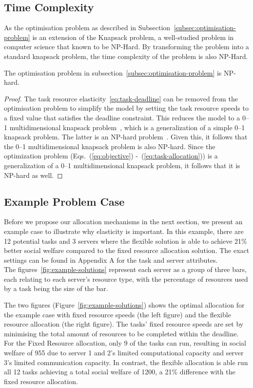 \subsection{Time Complexity}
\label{subsec:time-complexity}
As the optimisation problem as described in Subsection~\ref{subsec:optimisation-problem} is an extension of the
Knapsack problem, a well-studied problem in computer science that known to be NP-Hard. By transforming the problem into
a standard knapsack problem, the time complexity of the problem is also NP-Hard.
\begin{theorem}
    The optimisation problem in subsection~\ref{subsec:optimisation-problem} is NP-hard.
\end{theorem}
\begin{proof}
    The task resource elasticity~\ref{eq:task-deadline} can be removed from the optimisation problem to simplify the model
    by setting the task resource speeds to a fixed value that satisfies the deadline constraint. This reduces the model
    to a 0--1 multidimensional knapsack problem~\cite{knapsackproblems_2004}, which is a generalization of a
    simple 0--1 knapsack problem. The latter is an NP-hard problem~\cite{knapsackproblems_2004}. Given this, it follows
    that the 0--1 multidimensional knapsack problem is also NP-hard. Since the optimization problem
    (Eqs.~(\ref{eq:objective}) -~(\ref{eq:task-allocation})) is a generalization of a 0--1 multidimensional knapsack
    problem, it follows that it is NP-hard as well.
\end{proof}

\subsection{Example Problem Case}
\label{subsec:example-problem-case}
Before we propose our allocation mechanisms in the next section, we present an example case to illustrate
why elasticity is important. In this example, there are 12 potential tasks and 3 servers where the flexible solution
is able to achieve 21\% better social welfare compared to the fixed resource allocation solution.
The exact settings can be found in Appendix A for the task and server attributes. \\
The figures~\ref{fig:example-solutions} represent each server as a
group of three bars, each relating to each server's resource type, with the percentage of resources used by a task
being the size of the bar.

The two figures (Figure~\ref{fig:example-solutions}) shows the optimal allocation for the example
case with fixed resource speeds (the left figure) and the flexible resource allocation 
(the right figure). The tasks' fixed resource speeds are set by minimising the total
amount of resources to be completed within the deadline. For the Fixed Resource allocation,
only 9 of the tasks can run, resulting in social welfare of 955 due to server 1 and 2's
limited computational capacity and server 3's limited communication capacity.
In contrast, the flexible allocation is able run all 12 tasks achieving a total social welfare of 1200, a 21\% difference with the fixed resource allocation. 

